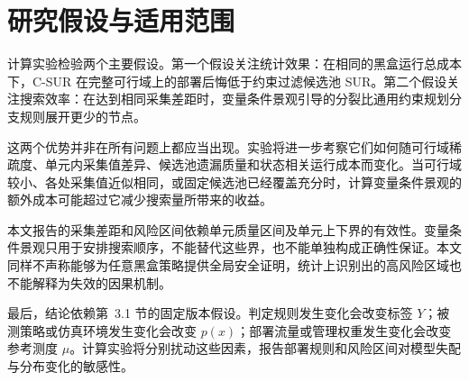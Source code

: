 \documentclass[UTF8,11pt,a4paper,fontset=none]{ctexart}
\newcommand{\1}{\mathbf 1}
\begin{document}
\section{研究假设与适用范围}

计算实验检验两个主要假设。第一个假设关注统计效果：在相同的黑盒运行总成本下，C-SUR 在完整可行域上的部署后悔低于约束过滤候选池 SUR。第二个假设关注搜索效率：在达到相同采集差距时，变量条件景观引导的分裂比通用约束规划分支规则展开更少的节点。

这两个优势并非在所有问题上都应当出现。实验将进一步考察它们如何随可行域稀疏度、单元内采集值差异、候选池遗漏质量和状态相关运行成本而变化。当可行域较小、各处采集值近似相同，或固定候选池已经覆盖充分时，计算变量条件景观的额外成本可能超过它减少搜索量所带来的收益。

本文报告的采集差距和风险区间依赖单元质量区间及单元上下界的有效性。变量条件景观只用于安排搜索顺序，不能替代这些界，也不能单独构成正确性保证。本文同样不声称能够为任意黑盒策略提供全局安全证明，统计上识别出的高风险区域也不能解释为失效的因果机制。

最后，结论依赖第~3.1 节的固定版本假设。判定规则发生变化会改变标签 $Y$；被测策略或仿真环境发生变化会改变 $p(x)$；部署流量或管理权重发生变化会改变参考测度 $\mu$。计算实验将分别扰动这些因素，报告部署规则和风险区间对模型失配与分布变化的敏感性。
\end{document}
